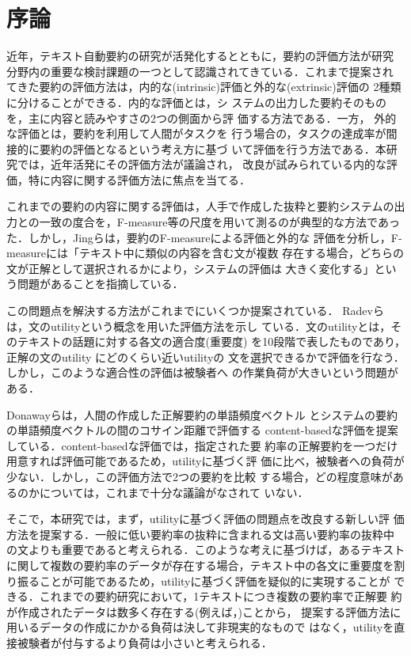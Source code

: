 \section{序論}

近年，テキスト自動要約の研究が活発化するとともに，要約の評価方法が研究
分野内の重要な検討課題の一つとして認識されてきている．これまで提案され
てきた要約の評価方法は，内的な(intrinsic)評価と外的な(extrinsic)評価の
2種類に分けることができる\cite{Sparck-Jones:1996}．内的な評価とは，シ
ステムの出力した要約そのものを，主に内容と読みやすさの2つの側面から評
価する方法である．一方， 外的な評価とは，要約を利用して人間がタスクを
行う場合の，タスクの達成率が間接的に要約の評価となるという考え方に基づ
いて評価を行う方法である．本研究では，近年活発にその評価方法が議論され，
改良が試みられている内的な評価，特に内容に関する評価方法に焦点を当てる．

これまでの要約の内容に関する評価は，人手で作成した抜粋と要約システムの出
力との一致の度合を，F-measure等の尺度を用いて測るのが典型的な方法であっ
た．しかし，Jingら\cite{jing:98:a}は，要約のF-measureによる評価と外的な
評価を分析し，F-measureには「テキスト中に類似の内容を含む文が複数
存在する場合，どちらの文が正解として選択されるかにより，システムの評価は
大きく変化する」という問題があることを指摘している．






この問題点を解決する方法がこれまでにいくつか提案されている．
Radevら\cite{radev:00:a}は，文のutilityという概念を用いた評価方法を示し
ている．文のutilityとは，そのテキストの話題に対する各文の適合度(重要度)
を10段階で表したものであり，正解の文のutility にどのくらい近いutilityの
文を選択できるかで評価を行なう．しかし，このような適合性の評価は被験者へ
の作業負荷が大きいという問題がある．

Donawayら\cite{Donaway:2000}は，人間の作成した正解要約の単語頻度ベクトル
とシステムの要約の単語頻度ベクトルの間のコサイン距離で評価する
content-basedな評価を提案している．content-basedな評価では，指定された要
約率の正解要約を一つだけ用意すれば評価可能であるため，utilityに基づく評
価に比べ，被験者への負荷が少ない．しかし，この評価方法で2つの要約を比較
する場合，どの程度意味があるのかについては，これまで十分な議論がなされて
いない．

そこで，本研究では，まず，utilityに基づく評価の問題点を改良する新しい評
価方法を提案する．一般に低い要約率の抜粋に含まれる文は高い要約率の抜粋中
の文よりも重要であると考えられる．このような考えに基づけば，あるテキスト
に関して複数の要約率のデータが存在する場合，テキスト中の各文に重要度を割
り振ることが可能であるため，utilityに基づく評価を疑似的に実現することが
できる．これまでの要約研究において，1テキストにつき複数の要約率で正解要
約が作成されたデータは数多く存在する(例えば，\cite{jing:98:a})ことから，
提案する評価方法に用いるデータの作成にかかる負荷は決して非現実的なもので
はなく，utilityを直接被験者が付与するより負荷は小さいと考えられる．




